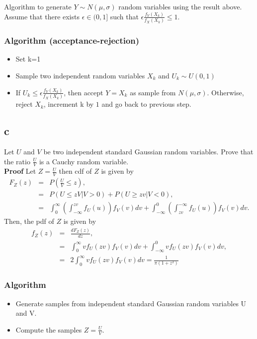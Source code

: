\documentclass[a4paper,11pt]{article}
\begin{document}
 Algorithm to generate $Y \sim N(\mu,\sigma)$ random variables using the result above.\\
Assume that there exists $\epsilon \in (0,1]$ such that $\epsilon \frac{f_{Y}(X_k)}{f_{X}(X_k)} \leq 1$.
\subsubsection*{Algorithm (acceptance-rejection)}
\vspace{0.02in}
\begin{itemize}
\item Set k=1
\item Sample two independent random variables $X_k$ and $U_k \sim U(0,1)$
\item If $U_{k} \leq \epsilon \frac{f_{Y}(X_k)}{f_{X}(X_k)}$, then accept $Y = X_k$ as sample from $N(\mu,\sigma)$. Otherwise, reject $X_k$, increment k by $1$ and go back to previous step.
\end{itemize}

\subsection*{c}
 Let $U$ and $V$ be two independent standard Gaussian random variables. Prove that the ratio $\frac{U}{V}$ is a Cauchy random variable.\\
\textbf{Proof}
\vspace{0.02in}
Let $Z = \frac{U}{V}$ then cdf of $Z$ is given by
\begin{eqnarray*}
F_{Z}(z) &=& P(\frac{U}{V} \leq z), \\
&=& P(U \leq zV | V>0) + P(U \geq zv | V < 0), \\
&=& \int_{0}^{\infty} \left( \int_{-\infty}^{zv} f_{U}(u) \right) f_{V}(v) dv + \int_{-\infty}^{0} \left( \int_{zv}^{-\infty} f_{U}(u) \right) f_{V}(v) dv.
\end{eqnarray*}
Then, the pdf of $Z$ is given by
\begin{eqnarray*}
f_{Z}(z) &=& \frac{dF_{Z}(z)}{dz}, \\
&=& \int_{0}^{\infty} v f_{U}(zv) f_{V}(v) dv + \int_{-\infty}^{0} v f_{U}(zv) f_{V}(v) dv, \\
&=& 2 \int_{0}^{\infty} v f_{U}(zv) f_{V}(v) dv = \frac{1}{\pi(1+z^2)}
\end{eqnarray*}

\subsubsection*{Algorithm}
\begin{itemize}
\item Generate samples from independent standard Gaussian random variables U and V.
\item Compute the samples $Z = \frac{U}{V}$.
\end{itemize}
\end{document}

